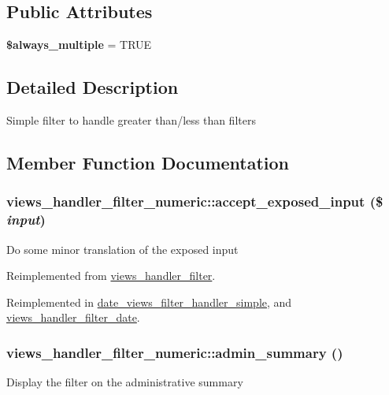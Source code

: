 \subsection*{Public Attributes}
\begin{DoxyCompactItemize}
\item 
\hypertarget{classviews__handler__filter__numeric_a0d669bedc1742f5a715b5c0639eb5885}{
{\bfseries \$always\_\-multiple} = TRUE}
\label{classviews__handler__filter__numeric_a0d669bedc1742f5a715b5c0639eb5885}

\end{DoxyCompactItemize}


\subsection{Detailed Description}
Simple filter to handle greater than/less than filters 

\subsection{Member Function Documentation}
\hypertarget{classviews__handler__filter__numeric_a0fd6abb3062be32410bef3c1cefdaaf5}{
\subsubsection[{accept\_\-exposed\_\-input}]{\setlength{\rightskip}{0pt plus 5cm}views\_\-handler\_\-filter\_\-numeric::accept\_\-exposed\_\-input (\$ {\em input})}}
\label{classviews__handler__filter__numeric_a0fd6abb3062be32410bef3c1cefdaaf5}
Do some minor translation of the exposed input 

Reimplemented from \hyperlink{classviews__handler__filter_a88ccd2ef359009614abb48fb83c2a738}{views\_\-handler\_\-filter}.

Reimplemented in \hyperlink{classdate__views__filter__handler__simple_af129fdbfc4ec0a307289b09e25bd5190}{date\_\-views\_\-filter\_\-handler\_\-simple}, and \hyperlink{classviews__handler__filter__date_a063da758bf1832f38454620cbc94e304}{views\_\-handler\_\-filter\_\-date}.\hypertarget{classviews__handler__filter__numeric_aaece85d3c36d4186c871cc55e636f4f2}{
\subsubsection[{admin\_\-summary}]{\setlength{\rightskip}{0pt plus 5cm}views\_\-handler\_\-filter\_\-numeric::admin\_\-summary ()}}
\label{classviews__handler__filter__numeric_aaece85d3c36d4186c871cc55e636f4f2}
Display the filter on the administrative summary 

